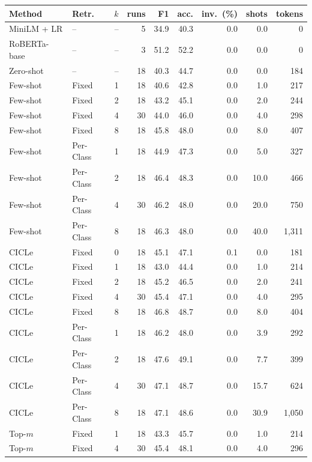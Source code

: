\begin{tabular}{llrrrrrrr}
\toprule
Method & Retr. & $k$ & runs & F1 & acc. & inv.\ (\%) & shots & tokens \\
\midrule
MiniLM + LR & -- & -- & 5 & 34.9 & 40.3 & 0.0 & 0.0 & 0 \\
RoBERTa-base & -- & -- & 3 & 51.2 & 52.2 & 0.0 & 0.0 & 0 \\
\midrule
Zero-shot & -- & -- & 18 & 40.3 & 44.7 & 0.0 & 0.0 & 184 \\
\midrule
Few-shot & Fixed & 1 & 18 & 40.6 & 42.8 & 0.0 & 1.0 & 217 \\
Few-shot & Fixed & 2 & 18 & 43.2 & 45.1 & 0.0 & 2.0 & 244 \\
Few-shot & Fixed & 4 & 30 & 44.0 & 46.0 & 0.0 & 4.0 & 298 \\
Few-shot & Fixed & 8 & 18 & 45.8 & 48.0 & 0.0 & 8.0 & 407 \\
Few-shot & Per-Class & 1 & 18 & 44.9 & 47.3 & 0.0 & 5.0 & 327 \\
Few-shot & Per-Class & 2 & 18 & 46.4 & 48.3 & 0.0 & 10.0 & 466 \\
Few-shot & Per-Class & 4 & 30 & 46.2 & 48.0 & 0.0 & 20.0 & 750 \\
Few-shot & Per-Class & 8 & 18 & 46.3 & 48.0 & 0.0 & 40.0 & 1,311 \\
CICLe & Fixed & 0 & 18 & 45.1 & 47.1 & 0.1 & 0.0 & 181 \\
CICLe & Fixed & 1 & 18 & 43.0 & 44.4 & 0.0 & 1.0 & 214 \\
CICLe & Fixed & 2 & 18 & 45.2 & 46.5 & 0.0 & 2.0 & 241 \\
CICLe & Fixed & 4 & 30 & 45.4 & 47.1 & 0.0 & 4.0 & 295 \\
CICLe & Fixed & 8 & 18 & 46.8 & 48.7 & 0.0 & 8.0 & 404 \\
CICLe & Per-Class & 1 & 18 & 46.2 & 48.0 & 0.0 & 3.9 & 292 \\
CICLe & Per-Class & 2 & 18 & 47.6 & 49.1 & 0.0 & 7.7 & 399 \\
CICLe & Per-Class & 4 & 30 & 47.1 & 48.7 & 0.0 & 15.7 & 624 \\
CICLe & Per-Class & 8 & 18 & 47.1 & 48.6 & 0.0 & 30.9 & 1,050 \\
\midrule
Top-$m$ & Fixed & 1 & 18 & 43.3 & 45.7 & 0.0 & 1.0 & 214 \\
Top-$m$ & Fixed & 4 & 30 & 45.4 & 48.1 & 0.0 & 4.0 & 296 \\

\end{tabular}
